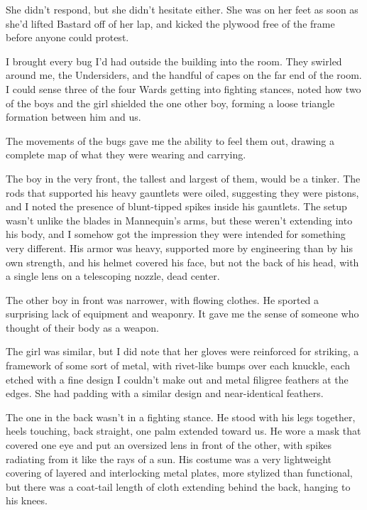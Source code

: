 She didn't respond, but she didn't hesitate either.  She was on her feet as soon as she'd lifted Bastard off of her lap, and kicked the plywood free of the frame before anyone could protest.



I brought every bug I'd had outside the building into the room.  They swirled around me, the Undersiders, and the handful of capes on the far end of the room.  I could sense three of the four Wards getting into fighting stances, noted how two of the boys and the girl shielded the one other boy, forming a loose triangle formation between him and us.



The movements of the bugs gave me the ability to feel them out, drawing a complete map of what they were wearing and carrying.



The boy in the very front, the tallest and largest of them, would be a tinker.  The rods that supported his heavy gauntlets were oiled, suggesting they were pistons, and I noted the presence of blunt-tipped spikes inside his gauntlets.  The setup wasn't unlike the blades in Mannequin's arms, but these weren't extending into his body, and I somehow got the impression they were intended for something very different.  His armor was heavy, supported more by engineering than by his own strength, and his helmet covered his face, but not the back of his head, with a single lens on a telescoping nozzle, dead center.



The other boy in front was narrower, with flowing clothes.  He sported a surprising lack of equipment and weaponry.  It gave me the sense of someone who thought of their body as a weapon.



The girl was similar, but I did note that her gloves were reinforced for striking, a framework of some sort of metal, with rivet-like bumps over each knuckle, each etched with a fine design I couldn't make out and metal filigree feathers at the edges.  She had padding with a similar design and near-identical feathers.



The one in the back wasn't in a fighting stance.  He stood with his legs together, heels touching, back straight, one palm extended toward us.  He wore a mask that covered one eye and put an oversized lens in front of the other, with spikes radiating from it like the rays of a sun.  His costume was a very lightweight covering of layered and interlocking metal plates, more stylized than functional, but there was a coat-tail length of cloth extending behind the back, hanging to his knees.



